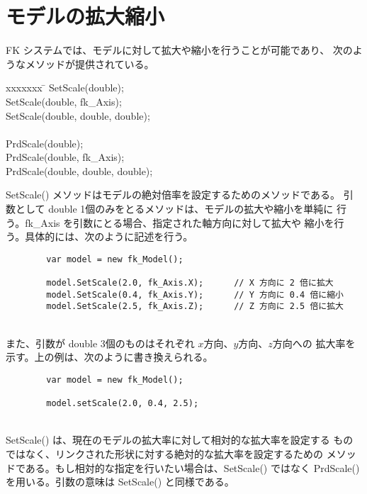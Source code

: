 \section{モデルの拡大縮小}
FK システムでは、モデルに対して拡大や縮小を行うことが可能であり、
次のようなメソッドが提供されている。
\begin{bf}
\begin{tabbing}
xxxxxxx \= \kill
\> SetScale(double); \\
\> SetScale(double, fk\_Axis); \\
\> SetScale(double, double, double); \\
\\
\> PrdScale(double); \\
\> PrdScale(double, fk\_Axis); \\
\> PrdScale(double, double, double); \\
\end{tabbing}
\end{bf}
SetScale() メソッドはモデルの絶対倍率を設定するためのメソッドである。
引数として double 1個のみをとるメソッドは、モデルの拡大や縮小を単純に
行う。fk\_Axis を引数にとる場合、指定された軸方向に対して拡大や
縮小を行う。具体的には、次のように記述を行う。
\\
\begin{breakbox}
\begin{verbatim}
        var model = new fk_Model();

        model.SetScale(2.0, fk_Axis.X);      // X 方向に 2 倍に拡大
        model.SetScale(0.4, fk_Axis.Y);      // Y 方向に 0.4 倍に縮小
        model.SetScale(2.5, fk_Axis.Z);      // Z 方向に 2.5 倍に拡大
\end{verbatim}
\end{breakbox}
~ \\
また、引数が double 3個のものはそれぞれ \(x\)方向、\(y\)方向、\(z\)方向への
拡大率を示す。上の例は、次のように書き換えられる。
\\
\begin{screen}
\begin{verbatim}
        var model = new fk_Model();

        model.setScale(2.0, 0.4, 2.5);
\end{verbatim}
\end{screen}
~ \\
SetScale() は、現在のモデルの拡大率に対して相対的な拡大率を設定する
ものではなく、リンクされた形状に対する絶対的な拡大率を設定するための
メソッドである。もし相対的な指定を行いたい場合は、SetScale() ではなく
PrdScale() を用いる。引数の意味は SetScale() と同様である。

